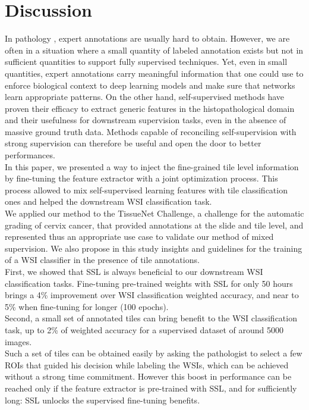 \section{Discussion}

In pathology , expert annotations are usually hard to obtain. However, we are often in a situation where a small quantity of labeled annotation exists but not in sufficient quantities to support  fully supervised techniques. Yet, even in small quantities, expert annotations carry meaningful information that one could use to enforce biological context to deep learning models and make sure that networks learn appropriate patterns. On the other hand, self-supervised methods have proven their efficacy to extract generic features in the histopathological domain and their usefulness for downstream supervision tasks, even in the absence of massive ground truth data. Methods capable of reconciling self-supervision with strong supervision can therefore be useful and open the door to better performances. \\

In this paper, we presented a way to inject the fine-grained tile level information by fine-tuning the feature extractor with a joint optimization process. This process allowed to mix self-supervised learning features with tile classification ones and helped the downstream WSI classification task.  \\

We applied our method to the TissueNet Challenge, a challenge for the automatic grading of cervix cancer, that provided annotations at the slide and tile level, and represented thus an appropriate use case to validate our method of mixed supervision. We also propose in this study insights and guidelines for the training of a WSI classifier in the presence of tile annotations. \\

First, we showed that SSL is always beneficial to our downstream WSI classification tasks. Fine-tuning pre-trained weights with SSL for only 50 hours brings a 4\% improvement over WSI classification weighted accuracy, and near to 5\% when fine-tuning for longer (100 epochs). \\

Second, a small set of annotated tiles can bring benefit to the WSI classification task, up to 2\% of weighted accuracy for a supervised dataset of around 5000 images. \\
Such a set of tiles can be obtained easily by asking the pathologist to select a few ROIs that guided his decision while labeling the WSIs, which can be achieved without a strong time commitment.
However this boost in performance can be reached only if the feature extractor is pre-trained with SSL, and for sufficiently long: SSL unlocks the supervised fine-tuning benefits.\\

